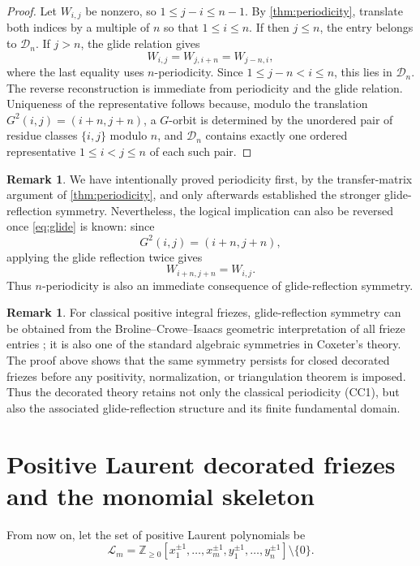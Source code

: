 \documentclass[amstex,11pt,reqno]{amsart}
\theoremstyle{definition}
\newtheorem{remark}[theorem]{Remark}
\newcommand{\Z}{\mathbb Z}
\newcommand{\cL}{\mathscr L}
\begin{document}
\begin{proof}
Let $W_{i,j}$ be nonzero, so $1\le j-i\le n-1$. By \cref{thm:periodicity}, translate both indices by a multiple of $n$ so that $1\le i\le n$. If then $j\le n$, the entry belongs to $\mathscr D_n$. If $j>n$, the glide relation gives
\[
 W_{i,j}=W_{j,i+n}=W_{j-n,i},
\]
where the last equality uses $n$-periodicity. Since $1\le j-n<i\le n$, this lies in $\mathscr D_n$. The reverse reconstruction is immediate from periodicity and the glide relation. Uniqueness of the representative follows because, modulo the translation $G^2(i,j)=(i+n,j+n)$, a $G$-orbit is determined by the unordered pair of residue classes $\{i,j\}$ modulo $n$, and $\mathscr D_n$ contains exactly one ordered representative $1\le i<j\le n$ of each such pair.
\end{proof}

\begin{remark}
\label{rem:glide-implies-period}
We have intentionally proved periodicity first, by the transfer-matrix argument of \cref{thm:periodicity}, and only afterwards established the stronger glide-reflection symmetry. Nevertheless, the logical implication can also be reversed once \eqref{eq:glide} is known: since
\[
 G^2(i,j)=(i+n,j+n),
\]
applying the glide reflection twice gives
\[
 W_{i+n,j+n}=W_{i,j}.
\]
Thus $n$-periodicity is also an immediate consequence of glide-reflection symmetry.
\end{remark}

\begin{remark}
\label{rem:classical-glide}
For classical positive integral friezes, glide-reflection symmetry can be obtained from the Broline--Crowe--Isaacs geometric interpretation of all frieze entries \cite{BCI}; it is also one of the standard algebraic symmetries in Coxeter's theory. The proof above shows that the same symmetry persists for closed decorated friezes before any positivity, normalization, or triangulation theorem is imposed. Thus the decorated theory retains not only the classical periodicity (CC1), but also the associated glide-reflection structure and its finite fundamental domain.
\end{remark}

\section{Positive Laurent decorated friezes and the monomial skeleton}\label{sec:positive}
From now on, let the set of positive Laurent polynomials be
\[
 \cL_m=
 \Z_{\geq0}[x_1^{\pm1},\ldots,x_m^{\pm1},y_1^{\pm1},\ldots,y_n^{\pm1}]\setminus\{0\}.
\]
\end{document}
